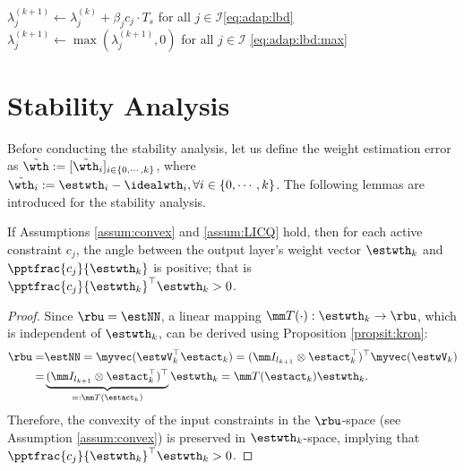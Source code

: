 \documentclass[letterpaper, journal]{IEEEtran}
\providecommand{\DIFadd}[1]{{\protect\color{blue}\uwave{#1}}} %
\providecommand{\DIFaddbegin}{} %
\providecommand{\DIFaddend}{} %
\begin{document}
\begin{algorithm}[!t]
\begin{algorithmic}[1]
            \STATE $\lambda_j^{(k+1)}
            \leftarrow
            \lambda_j^{(k)}
            +
            \beta_j c_j\cdot T_s$ for all $j\in\mathcal{I}$\DIFaddbegin \DIFadd{\,based\,on\,}\DIFaddend \eqref{eq:adap:lbd} 
            \STATE $\lambda_j^{(k+1)} \leftarrow \max(\lambda_j^{(k+1)},0)$ for all $j\in\mathcal{I}$ \DIFaddbegin \DIFadd{from }\DIFaddend \eqref{eq:adap:lbd:max} 

        \ENDFOR
    \end{algorithmic}
\end{algorithm}


\section{Stability Analysis}\label{sec:stability}

Before conducting the stability analysis, let us define the weight estimation error as $\tilde\wth:= [\tilde\wth_i]_{i\in\{0,\cdots,k\}}$, where $\tilde\wth_i:=\estwth_i-\idealwth_i, \forall i\in\{0,\cdots,k\}$.
The following lemmas are introduced for the stability analysis. 

\begin{lem}
    If Assumptions \ref{assum:convex} and \ref{assum:LICQ} hold, then for each active constraint $c_j$, the angle between the output layer's weight vector $\estwth_k$ and $\pptfrac{c_j}{\estwth_k}$ is positive; that is $\pptfrac{c_j}{\estwth_k}^\top\estwth_k>0$.
    \label{lem:convex:angle}
\end{lem}

\begin{proof}

Since $\rbu = \estNN$, a linear mapping $\mm T(\cdot):\estwth_k\to\rbu$, which is independent of $\estwth_k$, can be derived using Proposition \ref{propsit:kron}:
\begin{equation}\label{eq:linear:map}
    \begin{aligned}
    \rbu 
    = 
    &
    \estNN 
    =
    \myvec(
        \estwV_k^\top \estact_k
    ) 
    = 
    (
        \mm I_{l_{k+1}}
        \otimes 
        \estact_k^\top
    )^\top
    \myvec(\estwV_k)
    \\
    = &
    \underbrace{
        (
        \mm I_{l_{k+1}}
        \otimes 
        \estact_k^\top
    )^\top}_{=:\mm T(\estact_k)}
    \estwth_k 
    =
    \mm T(\estact_k) \estwth_k.
    \end{aligned}
\end{equation}
Therefore, the convexity of the input constraints in the $\rbu$-space (see Assumption \ref{assum:convex}) is preserved in $\estwth_k$-space, implying
that $\pptfrac{c_j}{\estwth_k}^\top\estwth_k>0$.

\end{proof}
\end{document}
